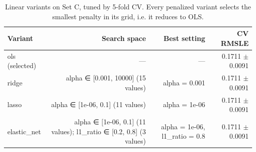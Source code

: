 \begin{table}[t]
\centering
\small
\begin{tabular}{lrrr}
\toprule
Variant & Search space & Best setting & CV RMSLE \\
\midrule
ols (selected) & --- & --- & 0.1711 $\pm$ 0.0091 \\
ridge & alpha ∈ [0.001, 10000] (15 values) & alpha = 0.001 & 0.1711 $\pm$ 0.0091 \\
lasso & alpha ∈ [1e-06, 0.1] (11 values) & alpha = 1e-06 & 0.1711 $\pm$ 0.0091 \\
elastic\_net & alpha ∈ [1e-06, 0.1] (11 values); l1\_ratio ∈ [0.2, 0.8] (3 values) & alpha = 1e-06, l1\_ratio = 0.8 & 0.1711 $\pm$ 0.0091 \\
\bottomrule
\end{tabular}
\caption{Linear variants on Set C, tuned by 5-fold CV. Every penalized variant selects the smallest penalty in its grid, i.e. it reduces to OLS.}
\label{tab:linear_variants}
\end{table}
